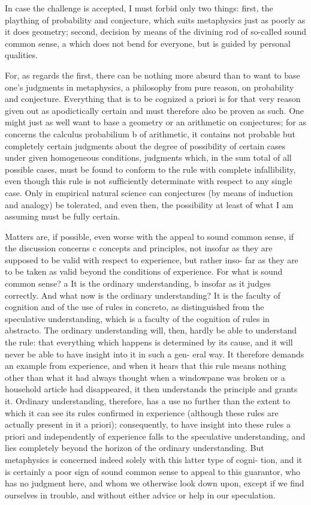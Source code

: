 In case the challenge is accepted, I must forbid only two things: ﬁrst,
the plaything of probability and conjecture, which suits metaphysics just
as poorly as it does geometry; second, decision by means of the divining
rod of so-called sound common sense, a which does not bend for everyone,
but is guided by personal qualities.

For, as regards the ﬁrst, there can be nothing more absurd than to want
to base one’s judgments in metaphysics, a philosophy from pure reason,
on probability and conjecture. Everything that is to be cognized a priori is
for that very reason given out as apodictically certain and must therefore
also be proven as such. One might just as well want to base a geometry
or an arithmetic on conjectures; for as concerns the calculus probabilium b
of arithmetic, it contains not probable but completely certain judgments
about the degree of possibility of certain cases under given homogeneous
conditions, judgments which, in the sum total of all possible cases, must
be found to conform to the rule with complete infallibility, even though
this rule is not sufﬁciently determinate with respect to any single case.
Only in empirical natural science can conjectures (by means of induction
and analogy) be tolerated, and even then, the possibility at least of what
I am assuming must be fully certain.

Matters are, if possible, even worse with the appeal to sound common
sense, if the discussion concerns c concepts and principles, not insofar as
they are supposed to be valid with respect to experience, but rather inso-
far as they are to be taken as valid beyond the conditions of experience.
For what is sound common sense? a It is the ordinary understanding, b insofar
as it judges correctly. And what now is the ordinary understanding? It is
the faculty of cognition and of the use of rules in concreto, as distinguished
from the speculative understanding, which is a faculty of the cognition of
rules in abstracto. The ordinary understanding will, then, hardly be able
to understand the rule: that everything which happens is determined by
its cause, and it will never be able to have insight into it in such a gen-
eral way. It therefore demands an example from experience, and when it
hears that this rule means nothing other than what it had always thought
when a windowpane was broken or a household article had disappeared,
it then understands the principle and grants it. Ordinary understanding,
therefore, has a use no further than the extent to which it can see its
rules conﬁrmed in experience (although these rules are actually present
in it a priori); consequently, to have insight into these rules a priori and
independently of experience falls to the speculative understanding, and
lies completely beyond the horizon of the ordinary understanding. But
metaphysics is concerned indeed solely with this latter type of cogni-
tion, and it is certainly a poor sign of sound common sense to appeal to
this guarantor, who has no judgment here, and whom we otherwise look
down upon, except if we ﬁnd ourselves in trouble, and without either
advice or help in our speculation.

